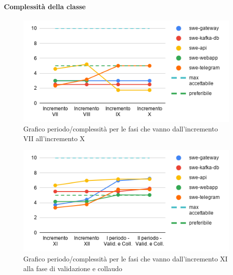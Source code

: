 \paragraph{Complessità della classe}
\begin{figure}[H]
			\centering
			\includegraphics[width=0.8\linewidth]{./res/images/QM-PROD-12-CCLA.png}
			\caption{Grafico periodo/complessità per le fasi che vanno dall'incremento VII all'incremento X}
			\label{fig:Grafico periodo/complessità per le fasi che vanno dall'incremento VII all'incremento X}
	\end{figure}
	\begin{figure}[H]
			\centering
			\includegraphics[width=0.8\linewidth]{./res/images/QM-PROD-12-CCLA_1.png}
			\caption{Grafico periodo/complessità per le fasi che vanno dall'incremento XI alla fase di validazione e collaudo}
			\label{fig:Grafico periodo/complessità per le fasi che vanno dall'incremento XI alla fase di validazione e collaudo}
	\end{figure}

